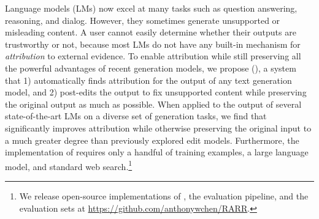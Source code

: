 Language models (LMs) now excel at many tasks such as %
question answering, reasoning, and dialog.
However, they sometimes generate unsupported or misleading content.
A user cannot easily determine whether their outputs are trustworthy or not, because most LMs do not have any built-in mechanism for \emph{attribution} to external evidence.
To enable attribution while still preserving all the powerful advantages of recent generation models, we propose \approach{} (\approachfull{}), a system that 1) automatically finds attribution for the output of any text generation model, and 2) post-edits the output to fix unsupported content while preserving the original output as much as possible.
When applied to the output of several state-of-the-art LMs on a diverse set of generation tasks, we find that \approach{} significantly improves attribution while otherwise preserving the original input to a much greater degree than previously explored edit models. Furthermore, the implementation of \approach{} requires only a handful of training examples, a large language model, and standard web search.\footnote{We release open-source implementations of \approach{}, the evaluation pipeline, and the evaluation sets at \url{https://github.com/anthonywchen/RARR}.}
